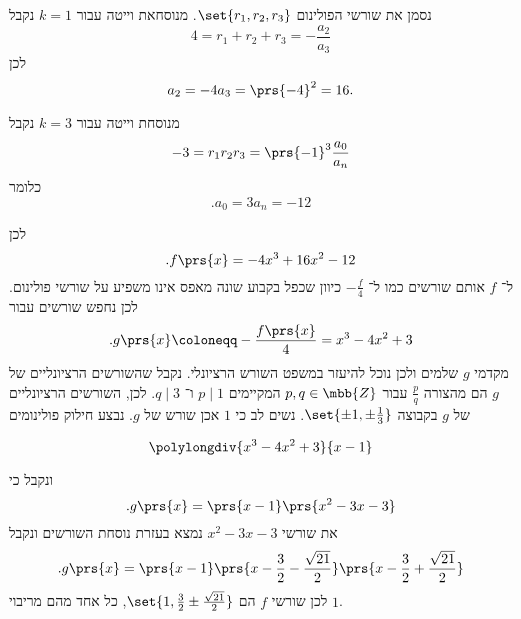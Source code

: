 \documentclass[article, 10pt,oneside]{article}
\begin{document}
\begin{solution}
נסמן את שורשי הפולינום
$\set{r_1, r_2, r_3}$.
מנוסחאת וייטה עבור
$k = 1$
נקבל
\[4 = r_1 + r_2 + r_3 = - \frac{a_2}{a_3}\]
לכן
\[a_2 = -4 a_3 = \prs{-4}^2 = 16 \text{.}\]

מנוסחת וייטה עבור
$k=3$
נקבל
\[-3 = r_1 r_2 r_3 = \prs{-1}^3 \frac{a_0}{a_n}\]
כלומר
\[\text{.} a_0 = 3 a_n = -12\]

לכן
\[\text{.} f\prs{x} = -4x^3 + 16x^2 - 12\]
ל־%
$f$
אותם שורשים כמו ל־%
$-\frac{f}{4}$
כיוון שכפל בקבוע שונה מאפס אינו משפיע על שורשי פולינום.
לכן נחפש שורשים עבור
\[\text{.} g\prs{x} \coloneqq -\frac{f\prs{x}}{4} = x^3 - 4x^2 + 3\]
מקדמי
$g$
שלמים ולכן נוכל להיעזר במשפט השורש הרציונלי. נקבל שהשורשים הרציונליים של
$g$
הם מהצורה
$\frac{p}{q}$
עבור
$p,q \in \mbb{Z}$
המקיימים
$p \mid 1$
ו־%
$q \mid 3$.
לכן, השורשים הרציונליים של
$g$
בקבוצה
$\set{\pm 1, \pm \frac{1}{3}}$.
נשים לב כי
$1$
אכן שורש של
$g$.
נבצע חילוק פולינומים

\begin{otherlanguage}{english}
\[
\polylongdiv{x^3 - 4x^2 + 3}{x-1}
\]
\end{otherlanguage}

ונקבל כי
\[\text{.} g\prs{x} = \prs{x-1}\prs{x^2 - 3x - 3}\]
את שורשי
$x^2 - 3x - 3$
נמצא בעזרת נוסחת השורשים ונקבל
\[\text{.} g\prs{x} = \prs{x-1} \prs{x-\frac{3}{2} - \frac{\sqrt{21}}{2}} \prs{x - \frac{3}{2} + \frac{\sqrt{21}}{2}}\]
לכן שורשי
$f$
הם
$\set{1, \frac{3}{2} \pm \frac{\sqrt{21}}{2}}$,
כל אחד מהם מריבוי
$1$.
\end{solution}
\end{document}
